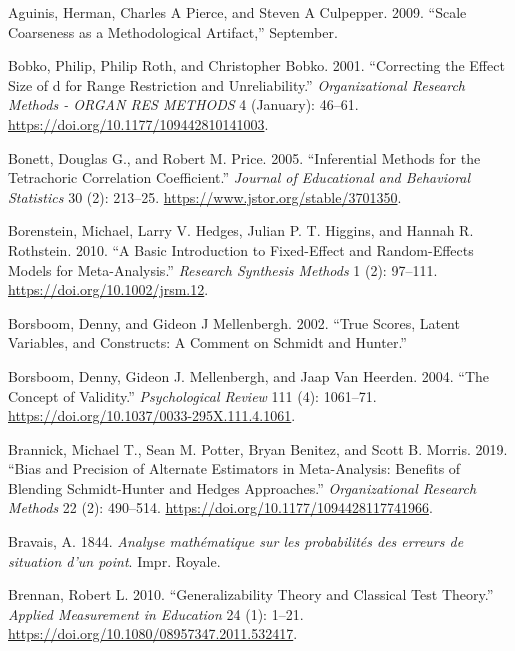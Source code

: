 \documentclass[
  letterpaper,
  DIV=11,
  numbers=noendperiod]{scrreprt}
\newlength{\cslhangindent}
\newlength{\cslentryspacingunit} %
\newenvironment{CSLReferences}[2] %
 {%
  \setlength{\parindent}{0pt}
  \ifodd #1
  \let\oldpar\par
  \def\par{\hangindent=\cslhangindent\oldpar}
  \fi
  \setlength{\parskip}{#2\cslentryspacingunit}
 }%
 {}
\begin{document}
\hypertarget{refs}{}
\begin{CSLReferences}{1}{0}
\leavevmode{}%
Aguinis, Herman, Charles A Pierce, and Steven A Culpepper. 2009.
{``Scale Coarseness as a Methodological Artifact,''} September.

\leavevmode{}%
Bobko, Philip, Philip Roth, and Christopher Bobko. 2001. {``Correcting
the Effect Size of d for Range Restriction and Unreliability.''}
\emph{Organizational Research Methods - ORGAN RES METHODS} 4 (January):
46--61. \url{https://doi.org/10.1177/109442810141003}.

\leavevmode{}%
Bonett, Douglas G., and Robert M. Price. 2005. {``Inferential Methods
for the Tetrachoric Correlation Coefficient.''} \emph{Journal of
Educational and Behavioral Statistics} 30 (2): 213--25.
\url{https://www.jstor.org/stable/3701350}.

\leavevmode{}%
Borenstein, Michael, Larry V. Hedges, Julian P. T. Higgins, and Hannah
R. Rothstein. 2010. {``A Basic Introduction to Fixed-Effect and
Random-Effects Models for Meta-Analysis.''} \emph{Research Synthesis
Methods} 1 (2): 97--111. \url{https://doi.org/10.1002/jrsm.12}.

\leavevmode{}%
Borsboom, Denny, and Gideon J Mellenbergh. 2002. {``True Scores, Latent
Variables, and Constructs: A Comment on Schmidt and Hunter.''}

\leavevmode{}%
Borsboom, Denny, Gideon J. Mellenbergh, and Jaap Van Heerden. 2004.
{``The Concept of Validity.''} \emph{Psychological Review} 111 (4):
1061--71. \url{https://doi.org/10.1037/0033-295X.111.4.1061}.

\leavevmode{}%
Brannick, Michael T., Sean M. Potter, Bryan Benitez, and Scott B.
Morris. 2019. {``Bias and Precision of Alternate Estimators in
Meta-Analysis: Benefits of Blending Schmidt-Hunter and Hedges
Approaches.''} \emph{Organizational Research Methods} 22 (2): 490--514.
\url{https://doi.org/10.1177/1094428117741966}.

\leavevmode{}%
Bravais, A. 1844. \emph{Analyse mathématique sur les probabilités des
erreurs de situation d'un point}. Impr. Royale.

\leavevmode{}%
Brennan, Robert L. 2010. {``Generalizability Theory and Classical Test
Theory.''} \emph{Applied Measurement in Education} 24 (1): 1--21.
\url{https://doi.org/10.1080/08957347.2011.532417}.


\end{CSLReferences}
\end{document}
